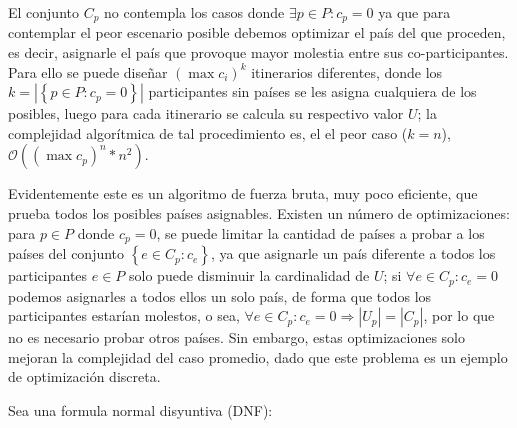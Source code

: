 El conjunto \(C_p\) no contempla los casos donde \(\exists p\in P:c_p=0\) ya que para contemplar el peor escenario posible debemos optimizar el país del que proceden, es decir, asignarle el país que provoque mayor molestia entre sus co-participantes. Para ello se puede dise\~nar \((\max{c_i})^k\) itinerarios diferentes, donde los \(k=\left\vert\left\{p\in P:c_p=0\right\}\right\vert\) participantes sin países se les asigna cualquiera de los posibles, luego para cada itinerario se calcula su respectivo valor \(U\); la complejidad algorítmica de tal procedimiento es, el el peor caso (\(k=n\)), \(\mathcal{O}((\max{c_p})^n*n^2)\).

Evidentemente este es un algoritmo de fuerza bruta, muy poco eficiente, que prueba todos los posibles países asignables. Existen un número de optimizaciones: para \(p\in P\) donde \(c_p=0\), se puede limitar la cantidad de países a probar a los países del conjunto \(\left\{e\in C_p:c_e\right\}\), ya que asignarle un país diferente a todos los participantes \(e\in P\) solo puede disminuir la cardinalidad de \(U\); si \(\forall e\in C_p:c_e=0\) podemos asignarles a todos ellos un solo país, de forma que todos los participantes estarían molestos, o sea, \(\forall e\in C_p:c_e=0\Rightarrow \left\vert U_p\right\vert=\left\vert C_p\right\vert\), por lo que no es necesario probar otros países. Sin embargo, estas optimizaciones solo mejoran la complejidad del caso promedio, dado que este problema es un ejemplo de optimización discreta.

Sea una formula normal disyuntiva (DNF):

